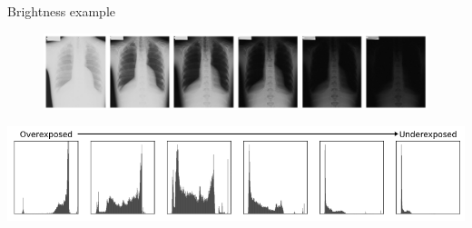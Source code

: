 \documentclass[9pt, aspectratio=169]{beamer}
\begin{document}
\begin{frame}
    {Brightness example}
    \centering
    \begin{figure}
        \includegraphics[width=\textwidth]{xray_brightness_Veldkamp_2009.png}
        \caption{\small{\color{gray}{Same X-ray, decreasing brightness - Image from Veldkamp et al., 2009}}}
    \end{figure}
    \includegraphics[width=\textwidth]{xray_brightness_Veldkamp_2009_histos.png}
\end{frame}
\end{document}
